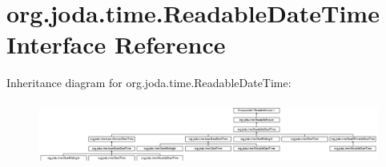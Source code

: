 \hypertarget{interfaceorg_1_1joda_1_1time_1_1_readable_date_time}{\section{org.\-joda.\-time.\-Readable\-Date\-Time Interface Reference}
\label{interfaceorg_1_1joda_1_1time_1_1_readable_date_time}
}
Inheritance diagram for org.\-joda.\-time.\-Readable\-Date\-Time\-:\begin{figure}[H]
\begin{center}
\leavevmode
\includegraphics[height=2.114537cm]{interfaceorg_1_1joda_1_1time_1_1_readable_date_time}
\end{center}
\end{figure}
